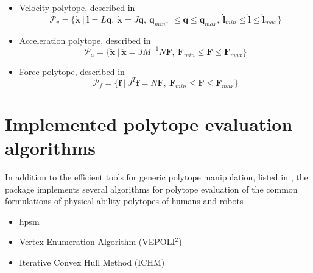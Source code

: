 \begin{itemize}
\itemindent=-13pt
\item Velocity polytope, described in 
\begin{equation}\label{eq:pv_h}
\mathcal{P}_{v} = \{\dot{\bm{x}} ~|~\dot{\bm{l}} = L\dot{\bm{q}},~ \dot{\bm{x}} = J\dot{\bm{q}},~ \dot{\bm{q}}_{min}, ~ \leq\dot{\bm{q}}\leq\dot{\bm{q}}_{max}, ~\dot{\bm{l}}_{min}\leq\dot{\bm{l}}\leq\dot{\bm{l}}_{max} \}
\end{equation}

\item Acceleration polytope, described in   
\begin{equation}\label{eq:pa_h}
\mathcal{P}_{a} = \{\ddot{\bm{x}} ~|~ \ddot{\bm{x}} = JM^{-1}N\bm{F},~ \bm{F}_{min}\leq \bm{F}\leq \bm{F}_{max} \}
\end{equation}

\item Force polytope, described in   
\begin{equation}\label{eq:pf_h}
\mathcal{P}_{f} = \{\bm{f} ~|~ J^T\bm{f} =N\bm{F},~ \bm{F}_{min}\leq \bm{F}\leq \bm{F}_{max} \}
\end{equation}
\end{itemize}


\section{Implemented polytope evaluation algorithms}
\label{sec:pycapacity_algos}

In addition to the efficient tools for generic polytope manipulation, listed in , the package implements several algorithms for polytope evaluation of the common formulations of physical ability polytopes of humans and robots

\begin{itemize}
    \item \gls{hpsm}
    \item Vertex Enumeration Algorithm (VEPOLI$^2$)
    \item Iterative Convex Hull Method (ICHM)
\end{itemize}

